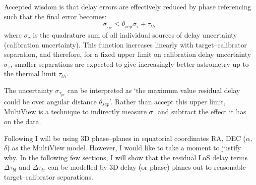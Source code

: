	Accepted wisdom \citep[e.g. ][]{ReidHonma2014} is that delay errors are effectively reduced by phase referencing such that the final error becomes:
	\begin{equation}
		\sigma_{\tau_{pr}} \le \theta_{sep}\sigma_\tau+\tau_{th}
		\label{eq:prerror}
	\end{equation} where $\sigma_\tau$ is the quadrature sum of all individual sources of delay uncertainty (calibration uncertainty). This function increases linearly with target--calibrator separation, and therefore, for a fixed upper limit on calibration delay uncertainty $\sigma_\tau$, smaller separations are expected to give increasingly better astrometry up to the thermal limit $\tau_{th}$.
	
	The uncertainty $\sigma_{\tau_{pr}}$ can be interpreted as `the maximum value residual delay could be over angular distance $\theta_{sep}$'. Rather than accept this upper limit, MultiView is a technique to indirectly measure $\sigma_{\tau}$ and subtract the effect it has on the data. %
	
	Following \citet{Rioja2017} I will be using 3D phase--planes in equatorial coordinates RA, DEC ($\alpha$, $\delta$) as the MultiView model. However, I would like to take a moment to justify why. In the following few sections, I will show that the residual LoS delay terms $\Delta\tau_{bl}$ and $\Delta\tau_{tr}$ can be modelled by 3D delay (or phase) planes out to reasonable target--calibrator separations.

